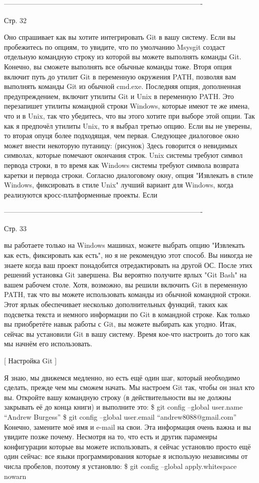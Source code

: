 -------------------------------------------------------------------------------------

Стр. 32

Оно спрашивает как вы хотите интегрировать Git в вашу систему. Если вы пробежитесь по 
опциям, то увидите, что по умолчанию Msysgit создаст отдельную командную строку из 
которой вы можете выполнять команды Git. Конечно, вы сможете выполнять все обычные
команды тоже. Вторя опция включит путь до утилит Git в переменную окружения PATH, 
позволяя вам выполнять команды Git из обычной cmd.exe. Последняя опция, дополненная
предупреждением, включит утилиты Git и Unix в переменную PATH. Это перезапишет утилиты
командной строки Windows, которые имеют те же имена, что и в Unix, так что убедитесь,
что вы этого хотите при выборе этой опции. Так как я предпочёл утилиты Unix, то я
выбрал третью опцию. Если вы не уверены, то вторая  опуця более подходящая, чем первая.
Следующее диалоговое окно может внести некоторую путаницу:
(рисунок)
Здесь говорится о невидимых символах, которые помечают окончания строк. Unix системы
требуют символ первода строки, в то время как Windows системы требуют символа возврата
каретки и первода строки.
Согласно диалоговому окну, опция "Извлекать в стиле Windows, фиксировать в стиле Unix"
лучший вариант для Windows, когда реализуются кросс-платформенные проекты. Если 

-------------------------------------------------------------------------------------

Стр. 33

вы работаете только на Windows машинах, можете выбрать опцию "Извлекать как есть, 
фиксировать как есть", но я не рекомендую этот способ. Вы никогда не знаете когда 
ваш проект понадобится отредактировать на другой ОС.
После этих решений установка Git завершена. Вы вероятно получите ярлых "Git Bash" на
вашем рабочем столе. Хотя, возможно, вы решили включить Git в переменную PATH, так что
вы можете использовать команды из обычной командной строки. Этот ярлык обеспечивает
несколько дополнительных функций, таких как подсветка текста и немного информации по Git
в командной строке. Как только вы приобретёте навык работы с Git, вы можете выбирать как
угодно.
Итак, сейчас вы установили Git в вашу систему. Время кое-что настроить до того как мы
начнём его использовать.

[ Настройка Git ]

Я знаю, мы движемся медленно, но есть ещё один шаг, который необходимо сделать, прежде
чем мы сможем начать. Мы настроем Git так, чтобы он знал кто вы.
Откройте вашу командную строку (в действительности вы не должны закрывать её до конца 
книги) и выполните это:
\$ git config --global user.name “Andrew Burgess”
\$ git config --global user.email “andrew8088@gmail.com”
Конечно, замените моё имя и e-mail на свои. Эта информация очень важна и вы увидите 
позже почему. Несмотря на то, что есть и другик парамеиры конфигурации которые вы можете
использовать, я сейчас установлю просто ещё один сейчас: все языки программирования 
которые я использую независимы от числа пробелов, поэтому я установлю:
\$ git config --global apply.whitespace nowarn

